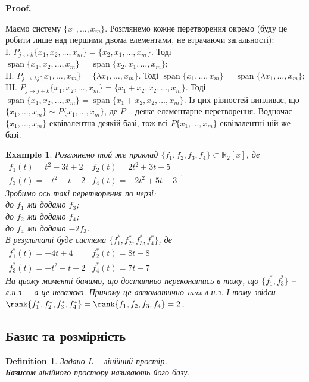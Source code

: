 \documentclass[a4paper, 10pt]{article}
\makeatletter
\theoremstyle{theoremdd}
\newtheorem{definition}[theorem]{Definition}
\newtheorem{example}[theorem]{Example}
\DeclareMathOperator{\linspan}{span}
\renewenvironment{proof}[1][Proof.\\]{\par
\pushQED{\hfill \qed}%
\normalfont \topsep6\p@\@plus6\p@\relax
\trivlist
\item\relax
{\bfseries
#1\@addpunct{.}}\hspace\labelsep\ignorespaces
}{%
\popQED\endtrivlist\@endpefalse
}
\makeatother
\begin{document}
	\begin{proof}
	Маємо систему $\{x_1,\dots,x_m\}$. Розглянемо кожне перетворення окремо (буду це робити лише над першими двома елементами, не втрачаючи загальності):\\
	I. $P_{j \leftrightarrow k} \{x_1,x_2,\dots,x_m\} = \{x_2,x_1,\dots,x_m\}$. Тоді $\linspan\{x_1,x_2,\dots,x_m\} = \linspan\{x_2,x_1,\dots,x_m\}$;\\
	II. $P_{j \to \lambda j} \{x_1,\dots,x_m\} = \{\lambda x_1,\dots,x_m \}$. Тоді $\linspan\{x_1,\dots,x_m\} = \linspan\{\lambda x_1,\dots,x_m\}$;\\
	III. $P_{j \to j+k} \{x_1,x_2,\dots,x_m\} = \{x_1+x_2,x_2,\dots,x_m\}$. Тоді $\linspan\{x_1,x_2,\dots,x_m\} = \linspan\{x_1+x_2,x_2,\dots,x_m\}$.
	Із цих рівностей випливає, що $\{x_1,\dots,x_m\} \sim P\{x_1,\dots,x_m\}$, де $P$ -- деяке елементарне перетворення. Водночас $\{x_1,\dots,x_m\}$ еквівалентна деякій базі, тож всі $P\{x_1,\dots,x_m\}$ еквівалентні цій же базі.
	\end{proof}
	
	\begin{example}
	Розглянемо той же приклад $\{f_1,f_2,f_3,f_4\} \subset \mathbb{R}_2[x]$, де\\
	$\begin{matrix}
	f_1(t) = t^2-3t+2 & f_2(t) = 2t^2+3t-5 \\
	f_3(t) = -t^2-t+2 & f_4(t) = -2t^2+5t-3
	\end{matrix}
	$.\\
	Зробимо ось такі перетворення по черзі:\\
	до $f_1$ ми додамо $f_3$;\\
	до $f_2$ ми додамо $f_4$;\\
	до $f_4$ ми додамо $-2f_3$.\\
	В результаті буде система $\{f_1^*,f_2^*,f_3^*,f_4^*\}$, де\\
	$\begin{matrix}
	f_1^*(t) = -4t+4 & f_2^*(t) = 8t-8 \\
	f_3^*(t) = -t^2-t+2 & f_4^*(t) = 7t-7
	\end{matrix}
	$\\
	На цьому моменті бачимо, що достатньо переконатись в тому, що $\{f_1^*,f_3^*\}$ -- л.н.з. -- а це неважко. Причому це автоматично max л.н.з. І тому звідси $\rank\{f_1^*,f_2^*,f_3^*,f_4^*\} = \rank\{f_1,f_2,f_3,f_4\} = 2$.
	\end{example}
	
	\subsection{Базис та розмірність}
	\begin{definition}
	Задано $L$ -- лінійний простір.\\
	\textbf{Базисом} лінійного простору називають його базу.
	\end{definition}
	
\end{document}
